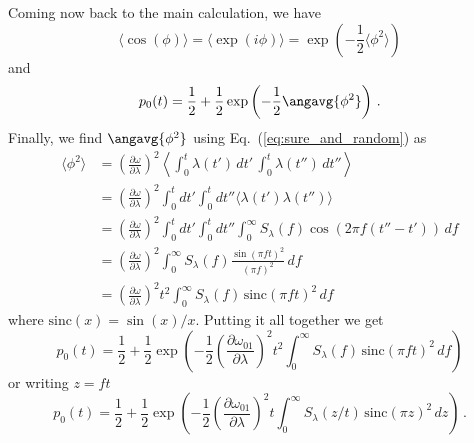 Coming now back to the main calculation, we have
\begin{equation}
  \langle \cos\left(\phi\right) \rangle
  = \langle \exp(i\phi) \rangle
  = \exp\left( -\frac{1}{2} \langle \phi^{2} \rangle \right)
\end{equation}
and
\begin{equation}
  p_0(t) = \frac{1}{2} + \frac{1}{2} \exp \left( - \frac{1}{2} \angavg{\phi^2} \right) \, .
\end{equation}
Finally, we find $\angavg{\phi^2}$ using Eq.~(\ref{eq:sure_and_random}) as
\begin{align}
  \langle \phi^2 \rangle
  &= \left( \frac{\partial \omega}{\partial\lambda} \right)^2 \left\langle \int_{0}^{t}\lambda(t')\, dt' \, \int_0^t \lambda(t'') \, dt'' \right\rangle \nonumber \\
  &= \left( \frac{\partial\omega} {\partial\lambda} \right)^2 \int_0^t dt' \int_0^t dt'' \langle\lambda(t') \lambda(t'') \rangle \nonumber \\
  &= \left(\frac{\partial\omega} {\partial\lambda}\right)^2 \int_0^t dt' \int_0^t dt'' \int_0^{\infty} S_{\lambda}(f) \cos \left( 2\pi f(t''-t') \right) \, df \nonumber \\
  &= \left(\frac{\partial\omega}{\partial\lambda} \right)^2 \int_0^{\infty} S_{\lambda}(f) \frac{\sin\left(\pi ft\right)^{2}}{\left(\pi f\right)^2} \, df \nonumber \\
  &= \left(\frac{\partial\omega}{\partial\lambda} \right)^2 t^2 \int_0^{\infty} S_{\lambda}(f) \, \text{sinc} \left(\pi f t \right)^2 \, df
\end{align}
where $\text{sinc}(x) = \sin(x) / x$.
Putting it all together we get
\begin{equation}
  p_0(t) = \frac{1}{2} + \frac{1}{2} \exp \left(-\frac{1}{2} \left(\frac{\partial\omega_{01}}{\partial\lambda}\right)^2 t^2 \int_0^{\infty} S_\lambda (f) \, \text{sinc}(\pi f t)^2\, df \right)
\end{equation}
or writing $z = f t$
\begin{equation}
  p_0(t) = \frac{1}{2} + \frac{1}{2} \exp \left( -\frac{1}{2} \left( \frac{\partial\omega_{01}}{\partial\lambda} \right)^2 t \int_0^\infty S_{\lambda} \left( z/t \right) \, \text{sinc}(\pi z)^2 \, dz \right) \, .
\end{equation}



